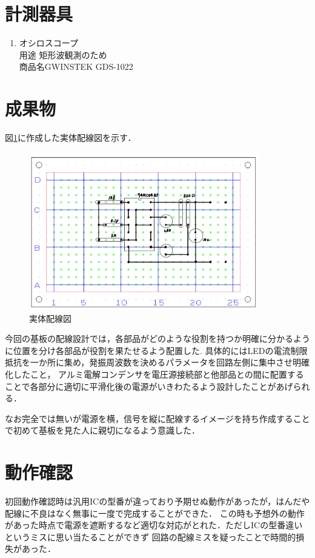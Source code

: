 \documentclass[titlepage]{jarticle}
\begin{document}
\section{計測器具}
\begin{enumerate}
    \item オシロスコープ\\用途 矩形波観測のため\\商品名GWINSTEK GDS-1022
\end{enumerate}

\section{成果物}
図\ref{fig:実体配線図}に作成した実体配線図を示す．
\begin{figure}[H]
    \begin{center}
        \includegraphics[width=10cm]{image/board.jpg}
        \caption{実体配線図}
        \label{fig:実体配線図}
    \end{center}
\end{figure}
今回の基板の配線設計では，各部品がどのような役割を持つか明確に分かるように位置を分け各部品が役割を果たせるよう配置した.
具体的にはLEDの電流制限抵抗を一か所に集め，発振周波数を決めるパラメータを回路左側に集中させ明確化したこと，
アルミ電解コンデンサを電圧源接続部と他部品との間に配置することで各部分に適切に平滑化後の電源がいきわたるよう設計したことがあげられる．

なお完全では無いが電源を横，信号を縦に配線するイメージを持ち作成することで初めて基板を見た人に親切になるよう意識した．

\section{動作確認}
初回動作確認時は汎用ICの型番が違っており予期せぬ動作があったが，はんだや配線に不良はなく無事に一度で完成することができた．
この時も予想外の動作があった時点で電源を遮断するなど適切な対応がとれた．ただしICの型番違いというミスに思い当たることができず
回路の配線ミスを疑ったことで時間的損失があった．
\end{document}
